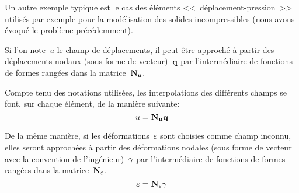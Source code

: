 \medskip
Un autre exemple typique est le cas des éléments <<~déplacement-pression~>>
utilisés par exemple pour la modélisation des solides incompressibles (nous avons
évoqué le problème précédemment).



\bigskip
{}

\medskip
Si l'on note~$u$ le champ de déplacements, il peut être approché à partir
des déplacements nodaux (sous forme de vecteur)~$\VV{q}$ par l'intermédiaire
de fonctions de formes rangées dans la matrice~$\MM{N_u}$.

Compte tenu des notations utilisées, les interpolations des différents
champs se font, sur chaque élément, de la manière suivante:
\begin{equation}
  u=\MM{N_u}\VV{q}
\end{equation}

De la même manière, si les déformations~$\varepsilon$ sont choisies comme champ inconnu,
elles seront approchées à partir des déformations nodales (sous forme de vecteur avec
la convention de l'ingénieur)~$\VV{\gamma}$ par l'intermédiaire de fonctions de formes rangées
dans la matrice~$\MM{N_\varepsilon}$.
\begin{equation}
  \varepsilon = \MM{N_\varepsilon}\VV{\gamma}
\end{equation}

